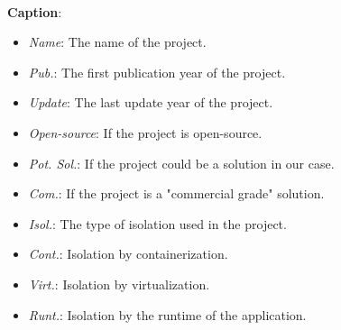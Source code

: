 \paragraph{}\textbf{Caption}: 
\begin{itemize}
  \item \textit{Name}: The name of the project.
  \item \textit{Pub.}: The first publication year of the project.
  \item \textit{Update}: The last update year of the project.
  \item \textit{Open-source}: If the project is open-source.
  \item \textit{Pot. Sol.}: If the project could be a solution in our case.
  \item \textit{Com.}: If the project is a "commercial grade" solution.
  \item \textit{Isol.}: The type of isolation used in the project.
  \item \textit{Cont.}: Isolation by containerization.
  \item \textit{Virt.}: Isolation by virtualization.
  \item \textit{Runt.}: Isolation by the runtime of the application.
\end{itemize}
